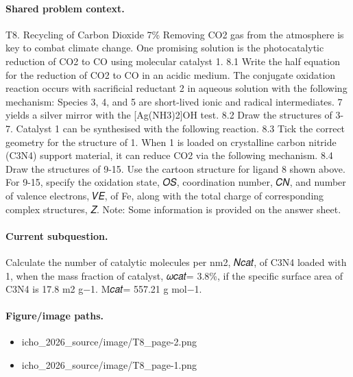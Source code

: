 \paragraph{Shared problem context.}
T8. Recycling of Carbon Dioxide 7\% Removing CO2 gas from the atmosphere is key to combat climate change. One promising solution is the photocatalytic reduction of CO2 to CO using molecular catalyst 1. 8.1 Write the half equation for the reduction of CO2 to CO in an acidic medium. The conjugate oxidation reaction occurs with sacrificial reductant 2 in aqueous solution with the following mechanism: Species 3, 4, and 5 are short-lived ionic and radical intermediates. 7 yields a silver mirror with the [Ag(NH3)2]OH test. 8.2 Draw the structures of 3-7. Catalyst 1 can be synthesised with the following reaction. 8.3 Tick the correct geometry for the structure of 1. When 1 is loaded on crystalline carbon nitride (C3N4) support material, it can reduce CO2 via the following mechanism. 8.4 Draw the structures of 9-15. Use the cartoon structure for ligand 8 shown above. For 9-15, specify the oxidation state, 𝑂𝑆, coordination number, 𝐶𝑁, and number of valence electrons, 𝑉𝐸, of Fe, along with the total charge of corresponding complex structures, 𝑍. Note: Some information is provided on the answer sheet.

\paragraph{Current subquestion.}
Calculate the number of catalytic molecules per nm2, 𝑁𝑐𝑎𝑡, of C3N4 loaded with 1, when the mass fraction of catalyst, 𝜔𝑐𝑎𝑡= 3.8\%, if the specific surface area of C3N4 is 17.8 m2 g−1. M𝑐𝑎𝑡= 557.21 g mol−1.

\paragraph{Figure/image paths.}
\begin{itemize}
\item icho\_2026\_source/image/T8\_page-2.png
\item icho\_2026\_source/image/T8\_page-1.png
\end{itemize}

